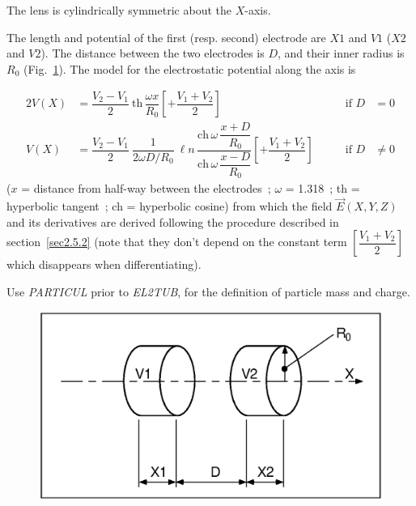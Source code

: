 {The lens is cylindrically symmetric about the $ X$-axis. 

\noindent The length and potential of the first (resp. second) electrode 
are $ X1 $ and $ V1 $ ($ X2 $ and $ V2$).   The distance between the two 
electrodes is $ D$,   and their inner radius is $ R_0 $ (Fig.~\ref{fig22}).   
The model for the electrostatic potential along the axis is~\cite{Biblio16}     %

 \begin{alignat*}{2}
	 V(X) &   = \dfrac{ V_2-V_1}{2} \: \text{th}\,
	            \dfrac{\omega x }{ R_0} 
	             \left[+ \dfrac{V_1+V_2 }{ 2} \right] 
	      & \qquad \text{if }  D & =0\\
	V(X) &  =  \dfrac{ V_2-V_1 }{ 2}\: \dfrac{1}{ 2\omega D/R_0} \: \ell n\,
	           \dfrac{\text{ch}\, \omega\,    \dfrac{x+D }{ R_0} }%
	           {\text{ch} \,\omega \,\dfrac{x-D }{ R_0}}
	           \left[+ \dfrac{V_1+V_2 }{ 2} \right]   
	            & \qquad \text{if }  D &  \not= 0 
 \end{alignat*}
%
($ x $ = distance from half-way between the electrodes~;
$\omega$  =  1.318~; th =  hyperbolic tangent~; ch  =  hyperbolic cosine)
from which the field $ \vec  E(X,Y,Z) $ and its derivatives are derived following the 
procedure described in section~\ref{sec2.5.2}  (note that they don't 
depend on the constant term $ \left[\dfrac{V_1+V_2 }{ 2} \right] $ which
disappears when differentiating). 

\medskip

\noindent Use \textsl{PARTICUL} prior to \textsl{EL2TUB}, for the
 definition of  particle mass and charge.

\vfill

\begin{figure}[H]
\centerline{\includegraphics[width=14cm]{Fig22.ps}}
\caption{\CapELtwoTUB \label{fig22}}
\end{figure}

}

